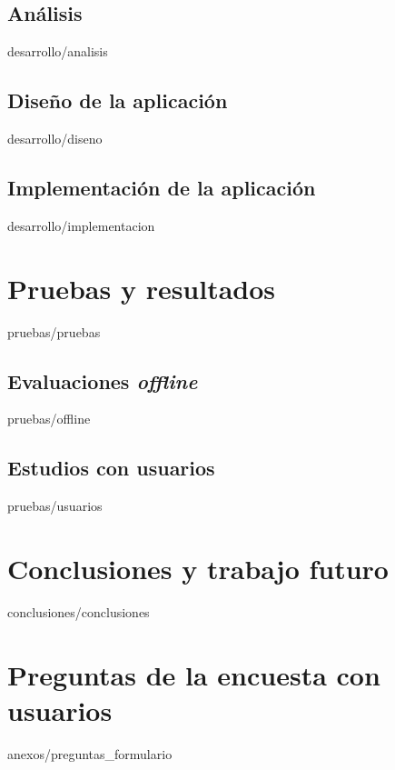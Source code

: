 \documentclass[epsbased,copyright,final,printable,covers,extendedindex,firstnumbered,tfm,gnuplot]{tfgtfmthesisuam}
\begin{document}
  \section{Análisis\label{SEC:ANALISIS}}{desarrollo/analisis}
  \section{Diseño de la aplicación\label{SEC:DISENO}}{desarrollo/diseno}
  \section{Implementación de la aplicación\label{SEC:IMPLEMENTACION}}{desarrollo/implementacion}



\chapter{Pruebas y resultados\label{CAP:PRUEBAS}}{pruebas/pruebas}
  \section{Evaluaciones \textit{offline}\label{SEC:EVALUACIONES_OFFLINE}}{pruebas/offline}
  \section{Estudios con usuarios\label{SEC:ESTUDIOS_USUARIOS}}{pruebas/usuarios}

\chapter{Conclusiones y trabajo futuro\label{CAP:CONCLUSIONES}}{conclusiones/conclusiones}

\appendix

\chapter{Preguntas de la encuesta con usuarios\label{CAP:PREGUNTAS_FORMULARIO}}{anexos/preguntas_formulario}
\end{document}
